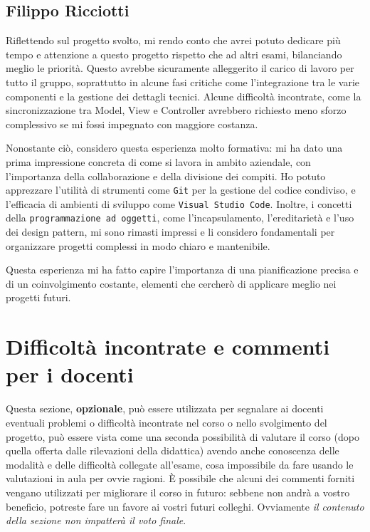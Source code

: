 \documentclass[a4paper,12pt]{report}
\begin{document}
\subsection{Filippo Ricciotti}
Riflettendo sul progetto svolto, mi rendo conto che avrei potuto dedicare più tempo e attenzione a questo progetto rispetto che ad altri esami, bilanciando meglio le priorità. Questo avrebbe sicuramente alleggerito il carico di lavoro per tutto il gruppo, soprattutto in alcune fasi critiche come l’integrazione tra le varie componenti e la gestione dei dettagli tecnici. Alcune difficoltà incontrate, come la sincronizzazione tra Model, View e Controller avrebbero richiesto meno sforzo complessivo se mi fossi impegnato con maggiore costanza.

Nonostante ciò, considero questa esperienza molto formativa: mi ha dato una prima impressione concreta di come si lavora in ambito aziendale, con l'importanza della collaborazione e della divisione dei compiti. Ho potuto apprezzare l'utilità di strumenti come \texttt{Git} per la gestione del codice condiviso, e l'efficacia di ambienti di sviluppo come \texttt{Visual Studio Code}. Inoltre, i concetti della \texttt{programmazione ad oggetti}, come l'incapsulamento, l'ereditarietà e l'uso dei design pattern, mi sono rimasti impressi e li considero fondamentali per organizzare progetti complessi in modo chiaro e mantenibile.

Questa esperienza mi ha fatto capire l'importanza di una pianificazione precisa e di un coinvolgimento costante, elementi che cercherò di applicare meglio nei progetti futuri.

\section{Difficoltà incontrate e commenti per i docenti}

Questa sezione, \textbf{opzionale}, può essere utilizzata per segnalare ai docenti eventuali problemi o difficoltà incontrate nel corso o nello svolgimento del progetto, può essere vista come una seconda possibilità di valutare il corso (dopo quella offerta dalle rilevazioni della didattica) avendo anche conoscenza delle modalità e delle difficoltà collegate all'esame, cosa impossibile da fare usando le valutazioni in aula per ovvie ragioni.
%
È possibile che alcuni dei commenti forniti vengano utilizzati per migliorare il corso in futuro: sebbene non andrà a vostro beneficio, potreste fare un favore ai vostri futuri colleghi.
%
Ovviamente \textit{il contenuto della sezione non impatterà il voto finale}.
\end{document}
